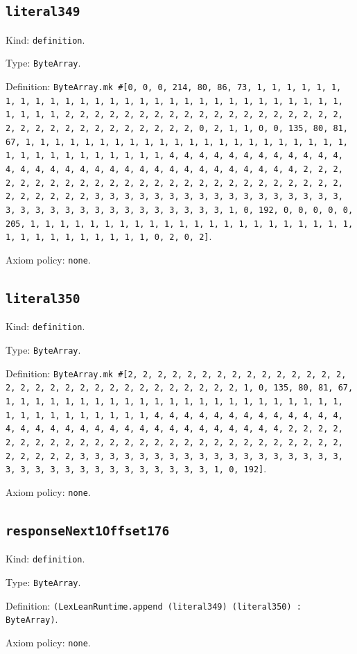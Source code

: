 \documentclass[11pt]{article}
\begin{document}
\subsection*{\texttt{literal349}}
\noindent Kind: \texttt{definition}.\par
\noindent Type: \texttt{ByteArray}.\par
\noindent Definition: \texttt{ByteArray.mk \#[0, 0, 0, 214, 80, 86, 73, 1, 1, 1, 1, 1, 1, 1, 1, 1, 1, 1, 1, 1, 1, 1, 1, 1, 1, 1, 1, 1, 1, 1, 1, 1, 1, 1, 1, 1, 1, 1, 1, 1, 2, 2, 2, 2, 2, 2, 2, 2, 2, 2, 2, 2, 2, 2, 2, 2, 2, 2, 2, 2, 2, 2, 2, 2, 2, 2, 2, 2, 2, 2, 2, 2, 0, 2, 1, 1, 0, 0, 135, 80, 81, 67, 1, 1, 1, 1, 1, 1, 1, 1, 1, 1, 1, 1, 1, 1, 1, 1, 1, 1, 1, 1, 1, 1, 1, 1, 1, 1, 1, 1, 1, 1, 1, 1, 1, 4, 4, 4, 4, 4, 4, 4, 4, 4, 4, 4, 4, 4, 4, 4, 4, 4, 4, 4, 4, 4, 4, 4, 4, 4, 4, 4, 4, 4, 4, 4, 4, 2, 2, 2, 2, 2, 2, 2, 2, 2, 2, 2, 2, 2, 2, 2, 2, 2, 2, 2, 2, 2, 2, 2, 2, 2, 2, 2, 2, 2, 2, 2, 2, 3, 3, 3, 3, 3, 3, 3, 3, 3, 3, 3, 3, 3, 3, 3, 3, 3, 3, 3, 3, 3, 3, 3, 3, 3, 3, 3, 3, 3, 3, 3, 3, 1, 0, 192, 0, 0, 0, 0, 0, 205, 1, 1, 1, 1, 1, 1, 1, 1, 1, 1, 1, 1, 1, 1, 1, 1, 1, 1, 1, 1, 1, 1, 1, 1, 1, 1, 1, 1, 1, 1, 1, 1, 0, 2, 0, 2]}.\par
\noindent Axiom policy: \texttt{none}.\par
\subsection*{\texttt{literal350}}
\noindent Kind: \texttt{definition}.\par
\noindent Type: \texttt{ByteArray}.\par
\noindent Definition: \texttt{ByteArray.mk \#[2, 2, 2, 2, 2, 2, 2, 2, 2, 2, 2, 2, 2, 2, 2, 2, 2, 2, 2, 2, 2, 2, 2, 2, 2, 2, 2, 2, 2, 2, 2, 1, 0, 135, 80, 81, 67, 1, 1, 1, 1, 1, 1, 1, 1, 1, 1, 1, 1, 1, 1, 1, 1, 1, 1, 1, 1, 1, 1, 1, 1, 1, 1, 1, 1, 1, 1, 1, 1, 1, 4, 4, 4, 4, 4, 4, 4, 4, 4, 4, 4, 4, 4, 4, 4, 4, 4, 4, 4, 4, 4, 4, 4, 4, 4, 4, 4, 4, 4, 4, 4, 4, 2, 2, 2, 2, 2, 2, 2, 2, 2, 2, 2, 2, 2, 2, 2, 2, 2, 2, 2, 2, 2, 2, 2, 2, 2, 2, 2, 2, 2, 2, 2, 2, 3, 3, 3, 3, 3, 3, 3, 3, 3, 3, 3, 3, 3, 3, 3, 3, 3, 3, 3, 3, 3, 3, 3, 3, 3, 3, 3, 3, 3, 3, 3, 3, 1, 0, 192]}.\par
\noindent Axiom policy: \texttt{none}.\par
\subsection*{\texttt{responseNext1Offset176}}
\noindent Kind: \texttt{definition}.\par
\noindent Type: \texttt{ByteArray}.\par
\noindent Definition: \texttt{(LexLeanRuntime.append (literal349) (literal350) : ByteArray)}.\par
\noindent Axiom policy: \texttt{none}.\par
\end{document}
